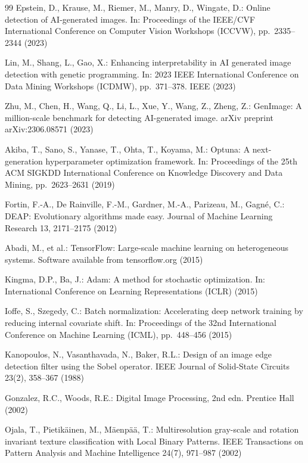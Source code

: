 \documentclass[runningheads]{llncs}
\begin{document}
\begin{thebibliography}{99}
Epstein, D., Krause, M., Riemer, M., Manry, D., Wingate, D.: Online detection of AI-generated images. In: Proceedings of the IEEE/CVF International Conference on Computer Vision Workshops (ICCVW), pp.\ 2335--2344 (2023)

Lin, M., Shang, L., Gao, X.: Enhancing interpretability in AI generated image detection with genetic programming. In: 2023 IEEE International Conference on Data Mining Workshops (ICDMW), pp.\ 371--378. IEEE (2023)

Zhu, M., Chen, H., Wang, Q., Li, L., Xue, Y., Wang, Z., Zheng, Z.: GenImage: A million-scale benchmark for detecting AI-generated image. arXiv preprint arXiv:2306.08571 (2023)

Akiba, T., Sano, S., Yanase, T., Ohta, T., Koyama, M.: Optuna: A next-generation hyperparameter optimization framework. In: Proceedings of the 25th ACM SIGKDD International Conference on Knowledge Discovery and Data Mining, pp.\ 2623--2631 (2019)

Fortin, F.-A., De Rainville, F.-M., Gardner, M.-A., Parizeau, M., Gagn\'e, C.: DEAP: Evolutionary algorithms made easy. Journal of Machine Learning Research 13, 2171--2175 (2012)

Abadi, M., et al.: TensorFlow: Large-scale machine learning on heterogeneous systems. Software available from tensorflow.org (2015)

Kingma, D.P., Ba, J.: Adam: A method for stochastic optimization. In: International Conference on Learning Representations (ICLR) (2015)

Ioffe, S., Szegedy, C.: Batch normalization: Accelerating deep network training by reducing internal covariate shift. In: Proceedings of the 32nd International Conference on Machine Learning (ICML), pp.\ 448--456 (2015)

Kanopoulos, N., Vasanthavada, N., Baker, R.L.: Design of an image edge detection filter using the Sobel operator. IEEE Journal of Solid-State Circuits 23(2), 358--367 (1988)

Gonzalez, R.C., Woods, R.E.: Digital Image Processing, 2nd edn. Prentice Hall (2002)

Ojala, T., Pietik\"ainen, M., M\"aenp\"a\"a, T.: Multiresolution gray-scale and rotation invariant texture classification with Local Binary Patterns. IEEE Transactions on Pattern Analysis and Machine Intelligence 24(7), 971--987 (2002)


\end{thebibliography}
\end{document}
